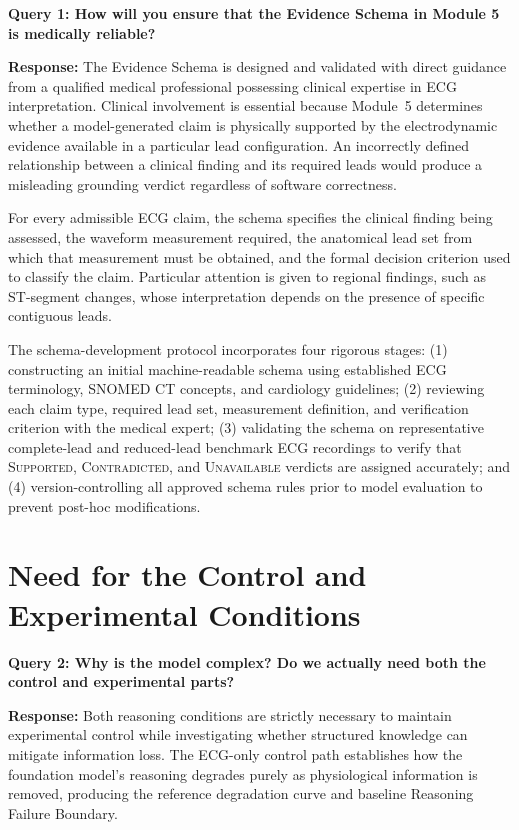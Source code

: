 \documentclass{ssnreview}
\begin{document}
\textbf{Query 1: How will you ensure that the Evidence Schema in Module 5 is medically
reliable?}

\textbf{Response:} The Evidence Schema is designed and validated with direct guidance from
a qualified medical professional possessing clinical expertise in ECG interpretation. Clinical
involvement is essential because Module~5 determines whether a model-generated claim is
physically supported by the electrodynamic evidence available in a particular lead
configuration. An incorrectly defined relationship between a clinical finding and its
required leads would produce a misleading grounding verdict regardless of software correctness.

For every admissible ECG claim, the schema specifies the clinical finding being assessed,
the waveform measurement required, the anatomical lead set from which that measurement
must be obtained, and the formal decision criterion used to classify the claim. Particular
attention is given to regional findings, such as ST-segment changes, whose interpretation
depends on the presence of specific contiguous leads. 

The schema-development protocol incorporates four rigorous stages: (1) constructing an
initial machine-readable schema using established ECG terminology, SNOMED CT concepts, and
cardiology guidelines; (2) reviewing each claim type, required lead set, measurement
definition, and verification criterion with the medical expert; (3) validating the schema on
representative complete-lead and reduced-lead benchmark ECG recordings to verify that
\textsc{Supported}, \textsc{Contradicted}, and \textsc{Unavailable} verdicts are assigned
accurately; and (4) version-controlling all approved schema rules prior to model evaluation to
prevent post-hoc modifications.

\section{Need for the Control and Experimental Conditions}

\textbf{Query 2: Why is the model complex? Do we actually need both the control and
experimental parts?}

\textbf{Response:} Both reasoning conditions are strictly necessary to maintain experimental
control while investigating whether structured knowledge can mitigate information loss.
The ECG-only control path establishes how the foundation model's reasoning degrades purely
as physiological information is removed, producing the reference degradation curve and
baseline Reasoning Failure Boundary. 
\end{document}
